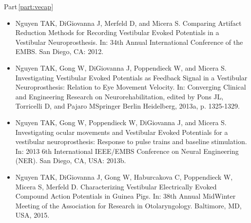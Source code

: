 Part\,\ref{part:vecap}
\begin{itemize}
\item Nguyen TAK, DiGiovanna J, Merfeld D, and Micera S. Comparing Artifact Reduction Methods for Recording Vestibular Evoked Potentials in a Vestibular Neuroprosthesis. In: 34th Annual International Conference of the EMBS. San Diego, CA: 2012.
\item Nguyen TAK, Gong W, DiGiovanna J, Poppendieck W, and Micera S. Investigating Vestibular Evoked Potentials as Feedback Signal in a Vestibular Neuroprosthesis: Relation to Eye Movement Velocity. In: Converging Clinical and Engineering Research on Neurorehabilitation, edited by Pons JL, Torricelli D, and Pajaro MSpringer Berlin Heidelberg, 2013a, p. 1325-1329.
\item Nguyen TAK, Gong W, Poppendieck W, DiGiovanna J, and Micera S. Investigating ocular movements and Vestibular Evoked Potentials for a vestibular neuroprosthesis: Response to pulse trains and baseline stimulation. In: 2013 6th International IEEE/EMBS Conference on Neural Engineering (NER). San Diego, CA, USA: 2013b.
\item Nguyen TAK, DiGiovanna J, Gong W, Haburcakova C, Poppendieck W, Micera S, Merfeld D. Characterizing Vestibular Electrically Evoked Compound Action Potentials in Guinea Pigs. In: 38th Annual MidWinter Meeting of the Association for Research in Otolaryngology. Baltimore, MD, USA, 2015.
\end{itemize}


